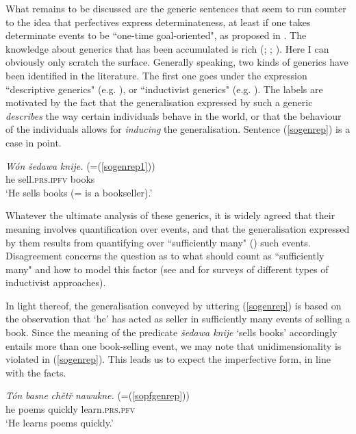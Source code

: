 \documentclass[output=paper,colorlinks,citecolor=brown]{langscibook}
\begin{document}
What remains to be discussed are the generic sentences that 
seem to run counter to the idea that perfectives express determinateness, at least if one takes determinate events to be ``one-time goal-oriented", as proposed in \citet{Toops2001}.
The knowledge about generics that has been accumulated is rich (\citealt{Cohen2022}; \citealt{Krifka1995}; \citealt{Leslie22}). 
Here I can obviously only scratch the surface. Generally speaking, two kinds of generics have been identified in the literature. The first one goes under the expression ``descriptive generics" (e.g. \citealt{Krifka13}), 
or ``inductivist generics" (e.g. \citealt{Carlson1995}).
The labels are motivated by the fact that the generalisation expressed by such a generic \textit{describes} the way certain individuals behave in the world, or that the behaviour of the individuals allows for \textit{inducing} the generalisation. Sentence (\ref{sogenrep}) is a case in point.    

  \ea\label{sogenrep}
\gll \textit{W\'on} \textit{šedawa} \textit{knije.} \hfill (=(\ref{sogenrep1}))\\
he sell.\textsc{prs.ipfv} books\\
\glt \normalsize{`He sells books (= is a bookseller).'}
\z

\noindent Whatever the ultimate analysis of these generics, it is widely agreed that their meaning involves quantification over events, and that the generalisation ex\-pressed by them results from quantifying over ``sufficiently many" (\citealt{Cohen2022}) such events. 
Disagreement concerns the question as to what should count as ``sufficiently many" and how to model this factor (see \citealt{Krifka1995} and \citealt{Cohen2022} for surveys of different types of inductivist approaches). 

In light thereof, the generalisation conveyed by uttering (\ref{sogenrep}) is based on the observation that `he' has acted as seller in sufficiently many events of selling a book. Since the meaning of the predicate \textit{šedawa knije} `sells books' accordingly entails more than one book-selling event, we may note that unidimensionality is violated in (\ref{sogenrep}). This leads us to expect the imperfective form, in line with the facts.

    \ea\label{sopfgenreprep}
\gll \textit{T\'on} \textit{basne} \textit{chětř} \textit{nawukne.} \hfill (=(\ref{sopfgenrep}))\\
he poems quickly learn.\textsc{prs.pfv}\\
\glt \normalsize{`He learns poems quickly.'}
\z
\end{document}
